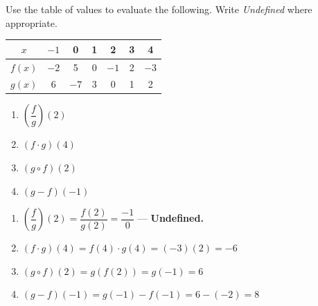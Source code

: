 \documentclass{ximera}
\begin{document}
\begin{problem}
Use the table of values to evaluate the following. Write \textit{Undefined} where appropriate.

\begin{center}
\begin{tabular}{|c|c|c|c|c|c|c|}
\hline
$x$ & $-1$ & 0 & 1 & 2 & 3 & 4 \\\hline
$f(x)$ & $-2$ & 5 & 0 & $-1$ & 2 & $-3$ \\\hline
$g(x)$ & 6 & $-7$ & 3 & 0 & 1 & 2 \\\hline
\end{tabular}
\end{center}

\begin{enumerate}
  \item[(a)] $\left(\dfrac{f}{g}\right)(2)$
  \medskip
  \item[(b)] $(f\cdot g)(4)$
  \medskip
  \item[(c)] $(g\circ f)(2)$
  \medskip
  \item[(d)] $(g-f)(-1)$
\end{enumerate}

\begin{solution}
\begin{enumerate}
  \item[(a)] $\left(\dfrac{f}{g}\right)(2) = \dfrac{f(2)}{g(2)} = \dfrac{-1}{0}$ --- \textbf{Undefined.}

  \item[(b)] $(f\cdot g)(4) = f(4)\cdot g(4) = (-3)(2) = -6$

  \item[(c)] $(g\circ f)(2) = g(f(2)) = g(-1) = 6$

  \item[(d)] $(g-f)(-1) = g(-1)-f(-1) = 6-(-2) = 8$
\end{enumerate}
\end{solution}
\end{problem}
\end{document}
